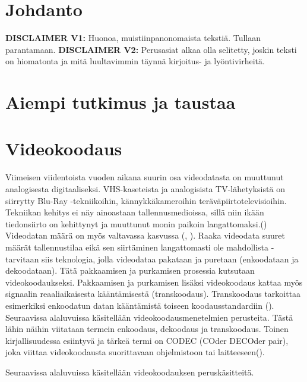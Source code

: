 
\section{Johdanto}

\textbf{DISCLAIMER V1:} Huonoa, muistiinpanonomaista tekstiä. Tullaan parantamaan.
\textbf{DISCLAIMER V2:} Perusasiat alkaa olla selitetty, joskin teksti on hiomatonta
ja mitä luultavimmin täynnä kirjoitus- ja lyöntivirheitä.

\newpage

\section{Aiempi tutkimus ja taustaa}



\newpage

\section{Videokoodaus}

Viimeisen viidentoista vuoden aikana suurin osa videodatasta on muuttunut
analogisesta digitaaliseksi. VHS-kaseteista ja analogisista TV-lähetyksistä
on siirrytty Blu-Ray -tekniikoihin, kännykkäkameroihin
teräväpiirtotelevisioihin. Tekniikan kehitys ei näy ainoastaan tallennusmedioissa,
sillä niin ikään tiedonsiirto on kehittynyt ja muuttunut monin paikoin
langattomaksi.(\cite{h264})
Videodatan määrä on myös valtavassa kasvussa (\cite{cisco}, \cite{youtube}).
Raaka videodata suuret määrät tallennustilaa eikä sen siirtäminen
langattomasti ole mahdollista - tarvitaan siis teknologia, jolla videodataa pakataan ja puretaan
(enkoodataan ja dekoodataan). Tätä pakkaamisen ja purkamisen prosessia
kutsutaan videokoodaukseksi. Pakkaamisen ja purkamisen lisäksi videokoodaus kattaa
myös signaalin reaaliaikaisesta kääntämisestä (transkoodaus). Transkoodaus
tarkoittaa esimerkiksi enkoodatun datan kääntämistä toiseen koodausstandardiin (\cite{mpeg_app}).
Seuraavissa alaluvuissa käsitellään videokoodausmenetelmien perusteita. Tästä lähin näihin viitataan termein
enkoodaus, dekoodaus ja transkoodaus. Toinen kirjallisuudessa esiintyvä ja
tärkeä termi on CODEC (COder DECOder pair), joka viittaa videokoodausta suorittavaan
ohjelmistoon tai laitteeseen(\cite{h264}).

Seuraavissa alaluvuissa käsitellään videokoodauksen peruskäsitteitä.

